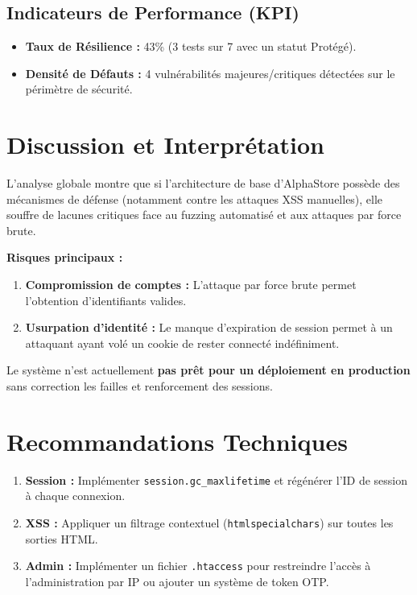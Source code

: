 \documentclass[a4paper,12pt]{article}
\begin{document}
    \subsection{Indicateurs de Performance (KPI)}
    \begin{itemize}[leftmargin=2em,itemsep=0.3em]
        \item \textbf{Taux de Résilience :} 43\% (3 tests sur 7 avec un statut Protégé).
        \item \textbf{Densité de Défauts :} 4 vulnérabilités majeures/critiques détectées sur le périmètre de sécurité.
    \end{itemize}

    \section{Discussion et Interprétation}

    L'analyse globale montre que si l'architecture de base d'AlphaStore possède des mécanismes de défense (notamment contre les attaques XSS manuelles), elle souffre de lacunes critiques face au fuzzing automatisé et aux attaques par force brute.

    \textbf{Risques principaux :}
    \begin{enumerate}[leftmargin=2em,itemsep=0.3em]
        \item \textbf{Compromission de comptes :} L'attaque par force brute permet l'obtention d'identifiants valides.
        \item \textbf{Usurpation d'identité :} Le manque d'expiration de session permet à un attaquant ayant volé un cookie de rester connecté indéfiniment.
    \end{enumerate}
    Le système n'est actuellement \textbf{pas prêt pour un déploiement en production} sans correction les failles  et renforcement des sessions.

    \section{Recommandations Techniques}

    \begin{enumerate}[leftmargin=2em,itemsep=0.5em]

        \item \textbf{Session :} Implémenter \texttt{session.gc\_maxlifetime} et régénérer l'ID de session à chaque connexion.
        \item \textbf{XSS :} Appliquer un filtrage contextuel (\texttt{htmlspecialchars}) sur toutes les sorties HTML.
        \item \textbf{Admin :} Implémenter un fichier \texttt{.htaccess} pour restreindre l'accès à l'administration par IP ou ajouter un système de token OTP.
    \end{enumerate}

    
\end{document}
